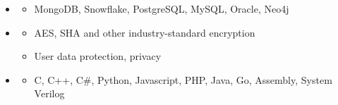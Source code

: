 \begin{itemize}
\begin{itemize}
  \end{itemize}
  \item {}
  \begin{itemize}
    \item MongoDB, Snowflake, PostgreSQL, MySQL, Oracle, Neo4j
  \end{itemize}
  \item {}
  \begin{itemize}
    \item AES, SHA and other industry-standard encryption
    \item User data protection, privacy
  \end{itemize}
  \item {}
  \begin{itemize}
    \item C, C++, C\#, Python, Javascript, PHP, Java, Go, Assembly, System Verilog
  \end{itemize}
\end{itemize}